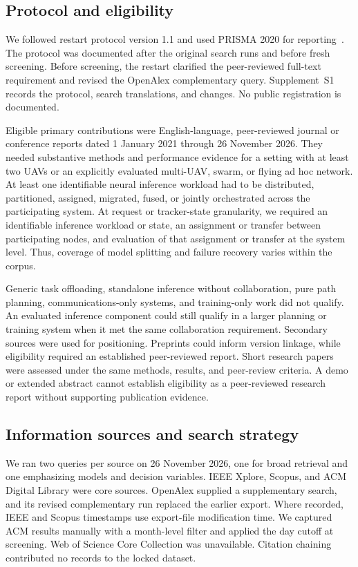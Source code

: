\documentclass[journal]{IEEEtran}
\begin{document}
\subsection{Protocol and eligibility}
We followed restart protocol version 1.1 and used PRISMA 2020 for reporting~\cite{prisma2020}. The protocol was documented after the original search runs and before fresh screening. Before screening, the restart clarified the peer-reviewed full-text requirement and revised the OpenAlex complementary query. Supplement~S1 records the protocol, search translations, and changes. No public registration is documented.

Eligible primary contributions were English-language, peer-reviewed journal or conference reports dated 1 January 2021 through 26 November 2026. They needed substantive methods and performance evidence for a setting with at least two UAVs or an explicitly evaluated multi-UAV, swarm, or flying ad hoc network. At least one identifiable neural inference workload had to be distributed, partitioned, assigned, migrated, fused, or jointly orchestrated across the participating system. At request or tracker-state granularity, we required an identifiable inference workload or state, an assignment or transfer between participating nodes, and evaluation of that assignment or transfer at the system level. Thus, coverage of model splitting and failure recovery varies within the corpus.

Generic task offloading, standalone inference without collaboration, pure path planning, communications-only systems, and training-only work did not qualify. An evaluated inference component could still qualify in a larger planning or training system when it met the same collaboration requirement. Secondary sources were used for positioning. Preprints could inform version linkage, while eligibility required an established peer-reviewed report. Short research papers were assessed under the same methods, results, and peer-review criteria. A demo or extended abstract cannot establish eligibility as a peer-reviewed research report without supporting publication evidence.

\subsection{Information sources and search strategy}
We ran two queries per source on 26 November 2026, one for broad retrieval and one emphasizing models and decision variables. IEEE Xplore, Scopus, and ACM Digital Library were core sources. OpenAlex supplied a supplementary search, and its revised complementary run replaced the earlier export. Where recorded, IEEE and Scopus timestamps use export-file modification time. We captured ACM results manually with a month-level filter and applied the day cutoff at screening. Web of Science Core Collection was unavailable. Citation chaining contributed no records to the locked dataset.
\end{document}
